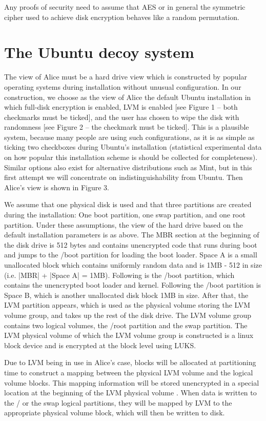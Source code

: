 \documentclass{acm_proc_article-sp}
\begin{document}
Any proofs of security need to assume that AES or in general the symmetric
cipher used to achieve disk encryption behaves like a random permutation.

\section{The Ubuntu decoy system}

The view of Alice must be a hard drive view which is constructed by popular
operating systems during installation without unusual configuration. In our
construction, we choose as the view of Alice the default Ubuntu installation in
which full-disk encryption is enabled, LVM is enabled [see Figure 1 – both
checkmarks must be ticked], and the user has chosen to wipe the disk with
randomness [see Figure 2 – the checkmark must be ticked]. This is a plausible
system, because many people are using such configurations, as it is as simple
as ticking two checkboxes during Ubuntu's installation (statistical
experimental data on how popular this installation scheme is should be
collected for completeness). Similar options also exist for alternative
distributions such as Mint, but in this first attempt we will concentrate on
indistinguishability from Ubuntu. Then Alice's view is shown in Figure 3.

We assume that one physical disk is used and that three partitions are created
during the installation: One boot partition, one swap partition, and one root
partition. Under these assumptions, the view of the hard drive based on the
default installation parameters is as above. The MBR section at the beginning
of the disk drive is 512 bytes and contains unencrypted code that runs during
boot and jumps to the /boot partition for loading the boot loader. Space A is a
small unallocated block which contains uniformly random data and is 1MB - 512
in size (i.e. |MBR| + |Space A| = 1MB). Following is the /boot partition, which
contains the unencrypted boot loader and kernel. Following the /boot partition
is Space B, which is another unallocated disk block 1MB in size. After that,
the LVM partition appears, which is used as the physical volume storing the LVM
volume group, and takes up the rest of the disk drive. The LVM volume group
contains two logical volumes, the /root partition and the swap partition. The
LVM physical volume of which the LVM volume group is constructed is a linux
block device and is encrypted at the block level using LUKS.

Due to LVM being in use in Alice's case, blocks will be allocated at
partitioning time to construct a mapping between the physical LVM volume and
the logical volume blocks. This mapping information will be stored unencrypted
in a special location at the beginning of the LVM physical volume \cite{c7}.
When data is written to the / or the swap logical partitions, they will be
mapped by LVM to the appropriate physical volume block, which will then be
written to disk.
\end{document}
